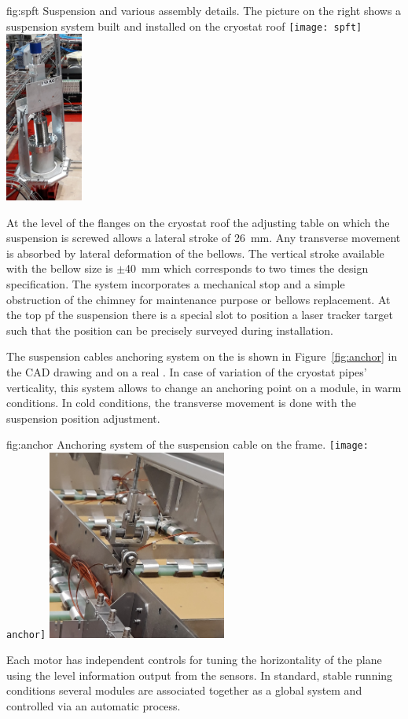 \begin{dunefigure}{fig:spft}
{Suspension \fdth and various assembly details. The picture on the right shows a suspension system built and installed on the  cryostat roof}
\texttt{[image: spft]}
\includegraphics[width=0.19\textwidth]{graphics/spft-crp}
\end{dunefigure}
At the level of the flanges on the cryostat roof the adjusting table on which the suspension \fdth is screwed allows a lateral stroke of \SI{26}{mm}. Any transverse movement is absorbed by lateral deformation of the bellows.
The vertical stroke available with the bellow size is $\pm$\SI{40}{mm} which corresponds to two times the design specification.
The system incorporates a  mechanical stop and a simple obstruction of the chimney for maintenance purpose or bellows replacement.
At the top pf the suspension \fdth there is a special slot to position a laser tracker target
such that the \fdth position can be precisely surveyed during installation.

The suspension cables anchoring system on the  is shown in Figure~\ref{fig:anchor} in the CAD drawing and on a real . 
In case of variation of the cryostat pipes' verticality, this system allows to change an anchoring point on a module, in warm conditions. In cold conditions, the transverse movement is done with the suspension \fdth position adjustment.
\begin{dunefigure}{fig:anchor}
{Anchoring system of the suspension cable on the  frame.}
\texttt{[image: anchor]}
\includegraphics[width=0.44\textwidth]{graphics/anchor-crp}
\end{dunefigure}
Each motor has independent controls for tuning the horizontality of the plane using the  level information output from the %
sensors. In standard, stable running  conditions several  modules are associated together as a global system and controlled via an automatic process.

